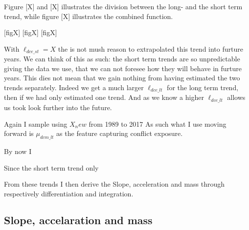\documentclass[a4paper]{article}
\begin{document}
Figure [X] and [X] illustrates the division between the long- and the short term trend, while figure [X] illustrates the combined function.\par

[figX]
[figX]
[figX]

With $\ell_{dce\_st} = X$ the is not mush reason to extrapolated this trend into furture years. We can think of this as such: the short term trends are so unpredictable giving the data we use, that we can not foresee how they will behave in furture years. This dies not mean that we gain nothing from having estimated the two trends separately. Indeed we get a much larger $\ell_{dce\_lt}$ for the long term trend, then if we had only estimated one trend. And as we know a higher $\ell_{dce\_lt}$ allows us took look further into the future. 

Again I sample using $X_new$ from 1989 to 2017 As such what I use moving forward is $\mu_{dcm\_lt}$ as the feature capturing conflict exposure.\par




By now I


Since the short term trend only

From these trends I then derive the Slope, acceleration and mass through respectively differentiation and integration.\par

\subsection{Slope, accelaration and mass}







\end{document}

